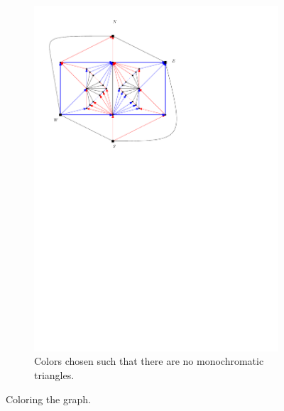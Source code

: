 \begin{figure}[h]
\begin{subfigure}[t]{0.3\textwidth}
      \includegraphics[width=\textwidth]{fixExtension/img/manymany3}
      \caption{Colors chosen such that there are no monochromatic triangles.}
      \label{fig:fix:manymany3}
    \end{subfigure}
    \caption{Coloring the graph.}
    \label{fig:fix:coloring}

\end{figure}
